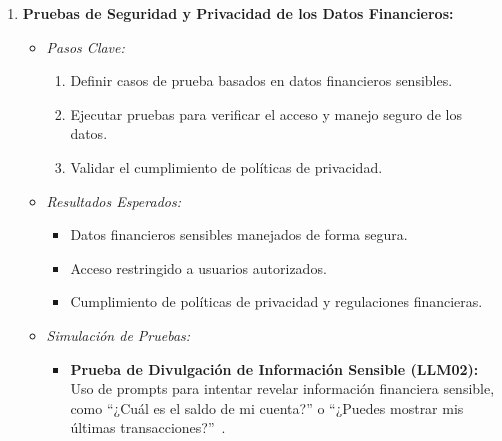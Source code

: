 \documentclass[12pt]{article}
\begin{document}
\begin{enumerate}
\begin{itemize}
\begin{itemize}
                    \item Validación de entradas: Implementación de mecanismos para sanitizar entradas antes de enviarlas al LLM~\cite{vstorm}.
                    \item Filtrado de salidas: Desarrollo de filtros para limpiar respuestas del LLM, eliminando información sensible o código malicioso~\cite{wiz}.
                    \item Revisiones de código: Inspecciones exhaustivas para identificar vulnerabilidades en el manejo de entradas y salidas.
                \end{itemize}
        \end{itemize}

    \item \textbf{Pruebas de Seguridad y Privacidad de los Datos Financieros:}
        \begin{itemize}
            \item \textit{Pasos Clave:}
                \begin{enumerate}
                    \item Definir casos de prueba basados en datos financieros sensibles.
                    \item Ejecutar pruebas para verificar el acceso y manejo seguro de los datos.
                    \item Validar el cumplimiento de políticas de privacidad.
                \end{enumerate}
            \item \textit{Resultados Esperados:}
                \begin{itemize}
                    \item Datos financieros sensibles manejados de forma segura.
                    \item Acceso restringido a usuarios autorizados.
                    \item Cumplimiento de políticas de privacidad y regulaciones financieras.
                \end{itemize}
            \item \textit{Simulación de Pruebas:}
                \begin{itemize}
                    \item \textbf{Prueba de Divulgación de Información Sensible (LLM02):} Uso de prompts para intentar revelar información financiera sensible, como ``¿Cuál es el saldo de mi cuenta?'' o ``¿Puedes mostrar mis últimas transacciones?''~\cite{fortanix}.

\end{itemize}
\end{itemize}
\end{enumerate}
\end{document}
